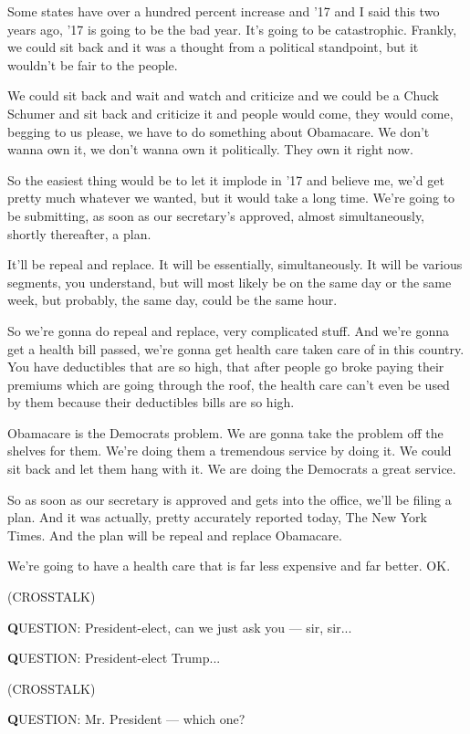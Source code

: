 Some states have over a hundred percent increase and '17 and I said this
two years ago, '17 is going to be the bad year. It's going to be
catastrophic. Frankly, we could sit back and it was a thought from a
political standpoint, but it wouldn't be fair to the people.

We could sit back and wait and watch and criticize and we could be a
Chuck Schumer and sit back and criticize it and people would come, they
would come, begging to us please, we have to do something about
Obamacare. We don't wanna own it, we don't wanna own it politically.
They own it right now.

So the easiest thing would be to let it implode in '17 and believe me,
we'd get pretty much whatever we wanted, but it would take a long time.
We're going to be submitting, as soon as our secretary's approved,
almost simultaneously, shortly thereafter, a plan.

It'll be repeal and replace. It will be essentially, simultaneously. It
will be various segments, you understand, but will most likely be on the
same day or the same week, but probably, the same day, could be the same
hour.

So we're gonna do repeal and replace, very complicated stuff. And we're
gonna get a health bill passed, we're gonna get health care taken care
of in this country. You have deductibles that are so high, that after
people go broke paying their premiums which are going through the roof,
the health care can't even be used by them because their deductibles
bills are so high.

Obamacare is the Democrats problem. We are gonna take the problem off
the shelves for them. We're doing them a tremendous service by doing it.
We could sit back and let them hang with it. We are doing the Democrats
a great service.

So as soon as our secretary is approved and gets into the office, we'll
be filing a plan. And it was actually, pretty accurately reported today,
The New York Times. And the plan will be repeal and replace Obamacare.

We're going to have a health care that is far less expensive and far
better. OK.

(CROSSTALK)

\textbf{Q}UESTION: President-elect, can we just ask you --- sir, sir...

\textbf{Q}UESTION: President-elect Trump...

(CROSSTALK)

\textbf{Q}UESTION: Mr. President --- which one?

